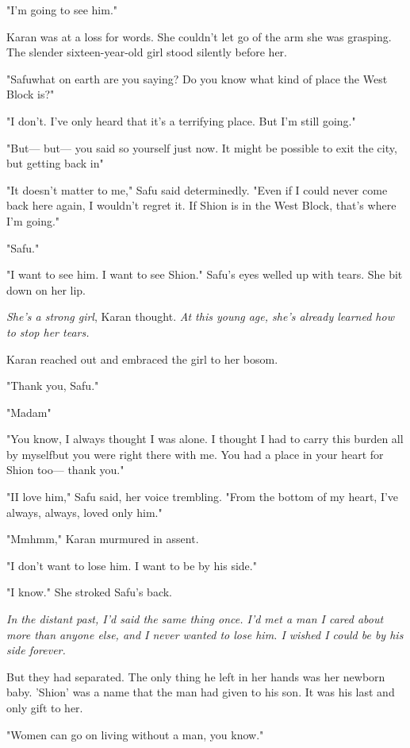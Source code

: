 "I'm going to see him."

\mybreak

Karan was at a loss for words. She couldn't let go of the arm she was
grasping. The slender sixteen-year-old girl stood silently before her.

"Safu\el what on earth are you saying? Do you know what kind of place
the West Block is?"

"I don't. I've only heard that it's a terrifying place. But I'm still
going."

"But--- but--- you said so yourself just now. It might be possible to exit
the city, but getting back in\el "

"It doesn't matter to me," Safu said determinedly. "Even if I could
never come back here again, I wouldn't regret it. If Shion is in the
West Block, that's where I'm going."

"Safu."

"I want to see him. I want to see Shion." Safu's eyes welled up with
tears. She bit down on her lip.

\emph{She's a strong girl}, Karan thought. \emph{At this young age, she's already
learned how to stop her tears.}

Karan reached out and embraced the girl to her bosom.

"Thank you, Safu."

"Madam\el "

"You know, I always thought I was alone. I thought I had to carry this
burden all by myself\el but you were right there with me. You had a
place in your heart for Shion too--- thank you."

"I\el I love him," Safu said, her voice trembling. "From the bottom of
my heart, I've always, always, loved only him."

"Mmhmm," Karan murmured in assent.

"I don't want to lose him. I want to be by his side."

"I know." She stroked Safu's back.

\emph{In the distant past, I'd said the same thing once. I'd met a man I cared
about more than anyone else, and I never wanted to lose him. I wished I
could be by his side forever.}

But they had separated. The only thing he left in her hands was her
newborn baby. 'Shion' was a name that the man had given to his son. It
was his last and only gift to her.

"Women can go on living without a man, you know."

